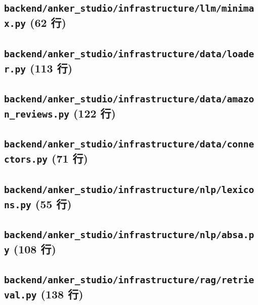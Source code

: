 \subsection*{\texttt{backend/anker\_studio/infrastructure/llm/minimax.py} \hfill \normalfont\small (62 行)}


\subsection*{\texttt{backend/anker\_studio/infrastructure/data/loader.py} \hfill \normalfont\small (113 行)}


\subsection*{\texttt{backend/anker\_studio/infrastructure/data/amazon\_reviews.py} \hfill \normalfont\small (122 行)}


\subsection*{\texttt{backend/anker\_studio/infrastructure/data/connectors.py} \hfill \normalfont\small (71 行)}


\subsection*{\texttt{backend/anker\_studio/infrastructure/nlp/lexicons.py} \hfill \normalfont\small (55 行)}


\subsection*{\texttt{backend/anker\_studio/infrastructure/nlp/absa.py} \hfill \normalfont\small (108 行)}


\subsection*{\texttt{backend/anker\_studio/infrastructure/rag/retrieval.py} \hfill \normalfont\small (138 行)}


